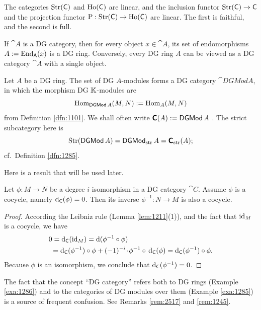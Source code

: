 The categories $\operatorname{Str}(\operatorname{\mathsf{C}})$ and $\operatorname{Ho}(\operatorname{\mathsf{C}})$ are linear, and 
the inclusion functor $\operatorname{Str}(\operatorname{\mathsf{C}}) \to \operatorname{\mathsf{C}}$ and the projection 
functor $\operatorname{P} : \operatorname{Str}(\operatorname{\mathsf{C}}) \to \operatorname{Ho}(\operatorname{\mathsf{C}})$
are linear. The first is faithful, and the second is full.

\begin{exa} \label{exa:1286}
If $\cat{A}$ is a DG category, then for every object $x \in \cat{A}$, 
its set of endomorphisms $A := \operatorname{End}_{\operatorname{\mathsf{A}}}(x)$ is a DG ring.
Conversely, every DG ring $A$ can be viewed as a DG category $\cat{A}$ 
with a single object.
\end{exa}

\begin{exa} \label{exa:1285}
Let $A$ be a DG ring. The set of DG $A$-modules forms a 
DG category $\cat{DGMod} A$, in which the morphism DG $\mathbb{K}$-modules are
\[ \operatorname{Hom}_{\operatorname{\mathsf{DGMod}} A}(M, N) := \operatorname{Hom}_{A}(M, N) \]
from Definition \ref{dfn:1101}. 
We shall often write $\boldsymbol{\mathsf{C}}(A) := \operatorname{\mathsf{DGMod}} A$%
. 
The strict subcategory here is 
\[ \operatorname{Str}(\operatorname{\mathsf{DGMod}} A) = \operatorname{\mathsf{DGMod}}_{\mathrm{str}} A 
= \boldsymbol{\mathsf{C}}_{\mathrm{str}}(A) ; \]
cf.\  Definition \ref{dfn:1285}. 
\end{exa}

Here is a result that will be used later. 

\begin{prop} \label{prop:1220}
Let $\phi : M \to N$ be a degree $i$ isomorphism in a DG category $\cat{C}$. 
Assume $\phi$ is a cocycle, namely 
$\mathrm{d}_{\operatorname{\mathsf{C}}}(\phi) = 0$. 
Then its inverse $\phi^{-1} : N \to M$ is also a cocycle.  
\end{prop}

\begin{proof}
According the Leibniz rule (Lemma \ref{lem:1211}(1)), and the fact that 
$\operatorname{id}_M$ is a cocycle, we have
\[ \begin{aligned}
& 0 = \d_{\cat{C}}(\opn{id}_M) = \d(\phi^{-1} \circ \phi)
\\ & \ 
= \d_{\cat{C}}(\phi^{-1}) \circ \phi + 
(-1)^{-i} \cd \phi^{-1} \circ \, \d_{\cat{C}}(\phi) 
= \d_{\cat{C}}(\phi^{-1}) \circ \phi . 
\end{aligned} \]
Because $\phi$ is an isomorphism, we conclude that 
$\mathrm{d}_{\operatorname{\mathsf{C}}}(\phi^{-1}) = 0$. 
\end{proof}

\begin{rem} \label{rem:1270}
The fact that the concept ``DG category'' refers both to DG rings 
(Example \ref{exa:1286}) and to the categories of DG modules over them (Example 
\ref{exa:1285}) is a source of frequent confusion. See Remarks \ref{rem:2517} 
and \ref{rem:1245}. 
\end{rem}

